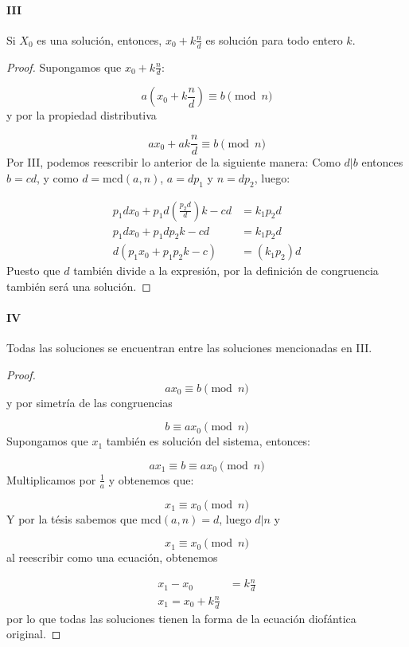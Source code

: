 \documentclass{article}
\begin{document}
\paragraph{III} Si $X_0$ es una solución, entonces, $x_0 + k \frac{n}{d}$ es solución para todo entero $k$.

\begin{proof}
Supongamos que $x_0 + k \frac{n}{d}$:

$$a\left(x_0 + k \frac{n}{d}\right) \equiv b \pmod{n}$$
y por la propiedad distributiva

$$ax_0 + ak \frac{n}{d} \equiv b \pmod{n}$$
Por III, podemos reescribir lo anterior de la siguiente manera: Como $d|b$ entonces $b=cd$, y como $d=\text{mcd}(a,n)$, $a=dp_1$ y $n = d p_2$, luego:

\begin{align*}
    p_1dx_0 + p_1d \left(\frac{p_2d}{d}\right)k - cd &= k_1p_2d\\
    p_1dx_0 + p_1d p_2 k - cd &= k_1p_2d\\
    d(p_1x_0 + p_1 p_2 k - c) &= (k_1p_2)d
\end{align*}
Puesto que $d$ también divide a la expresión, por la definición de congruencia también será una solución.
\end{proof}

\paragraph{IV} Todas las soluciones se encuentran entre las soluciones mencionadas en III.

\begin{proof}
$$ax_0 \equiv b \pmod{n}$$
y por simetría de las congruencias

$$b \equiv ax_0 \pmod{n}$$
Supongamos que $x_1$ también es solución del sistema, entonces:

$$ax_1 \equiv b \equiv a x_0 \pmod{n}$$
Multiplicamos por $\frac{1}{a}$ y obtenemos que:

$$x_1\equiv x_0 \pmod{n}$$
Y por la tésis sabemos que $\text{mcd}(a,n) = d$, luego $d|n$ y 

$$x_1 \equiv x_0 \pmod{n}$$
al reescribir como una ecuación, obtenemos

\begin{align*}
    x_1 - x_0 &= k\frac{n}{d}\\
    x_1 = x_0 + k\frac{n}{d}
\end{align*}
por lo que todas las soluciones tienen la forma de la ecuación diofántica original.
\end{proof}
\end{document}
